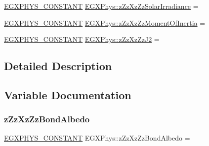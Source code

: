 \begin{DoxyCompactItemize}
\mbox{\hyperlink{group___e_g_x_phys-_constants-_macros_ga76980d288494ce1714c9ac68a95ba702}{E\+G\+X\+P\+H\+Y\+S\+\_\+\+C\+O\+N\+S\+T\+A\+NT}} \mbox{\hyperlink{group___e_g_x_phys-_constants-_astrophysics-_solar_system-_z_x_z-_bulk_gaa789319f8b2eef61c67715c86ccb1e6c}{E\+G\+X\+Phys\+::z\+Zz\+Xz\+Zz\+Solar\+Irradiance}} =
\item 
\mbox{\hyperlink{group___e_g_x_phys-_constants-_macros_ga76980d288494ce1714c9ac68a95ba702}{E\+G\+X\+P\+H\+Y\+S\+\_\+\+C\+O\+N\+S\+T\+A\+NT}} \mbox{\hyperlink{group___e_g_x_phys-_constants-_astrophysics-_solar_system-_z_x_z-_bulk_ga3e49db9f81c952a2e1445e9e50ccc164}{E\+G\+X\+Phys\+::z\+Zz\+Xz\+Zz\+Moment\+Of\+Inertia}} =
\item 
\mbox{\hyperlink{group___e_g_x_phys-_constants-_macros_ga76980d288494ce1714c9ac68a95ba702}{E\+G\+X\+P\+H\+Y\+S\+\_\+\+C\+O\+N\+S\+T\+A\+NT}} \mbox{\hyperlink{group___e_g_x_phys-_constants-_astrophysics-_solar_system-_z_x_z-_bulk_ga6f27887b6a4211d588c4b2d398de48b2}{E\+G\+X\+Phys\+::z\+Zz\+Xz\+Zz\+J2}} =
\end{DoxyCompactItemize}


\subsection{Detailed Description}


\subsection{Variable Documentation}
\mbox{\label{group___e_g_x_phys-_constants-_astrophysics-_solar_system-_z_x_z-_bulk_ga9df51521d1e2e7cb6db7545fd27726cf}} 
\subsubsection{\texorpdfstring{z\+Zz\+Xz\+Zz\+Bond\+Albedo}{zZzXzZzBondAlbedo}}
{\footnotesize\ttfamily \mbox{\hyperlink{group___e_g_x_phys-_constants-_macros_ga76980d288494ce1714c9ac68a95ba702}{E\+G\+X\+P\+H\+Y\+S\+\_\+\+C\+O\+N\+S\+T\+A\+NT}} E\+G\+X\+Phys\+::z\+Zz\+Xz\+Zz\+Bond\+Albedo =}

